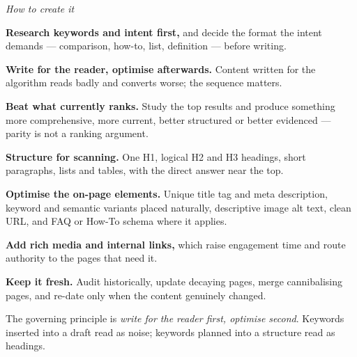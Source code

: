 \begin{qlist}
\textit{How to create it}
\begin{apts}\setcounter{enumi}{4}
\item \textbf{Research keywords and intent first,} and decide the format the
      intent demands --- comparison, how-to, list, definition --- before writing.
\item \textbf{Write for the reader, optimise afterwards.} Content written for
      the algorithm reads badly and converts worse; the sequence matters.
\item \textbf{Beat what currently ranks.} Study the top results and produce
      something more comprehensive, more current, better structured or better
      evidenced --- parity is not a ranking argument.
\item \textbf{Structure for scanning.} One H1, logical H2 and H3 headings,
      short paragraphs, lists and tables, with the direct answer near the top.
\item \textbf{Optimise the on-page elements.} Unique title tag and meta
      description, keyword and semantic variants placed naturally, descriptive
      image alt text, clean URL, and FAQ or How-To schema where it applies.
\item \textbf{Add rich media and internal links,} which raise engagement time
      and route authority to the pages that need it.
\item \textbf{Keep it fresh.} Audit historically, update decaying pages, merge
      cannibalising pages, and re-date only when the content genuinely changed.
\end{apts}

The governing principle is \emph{write for the reader first, optimise second}.
Keywords inserted into a draft read as noise; keywords planned into a structure
read as headings.


\end{qlist}
